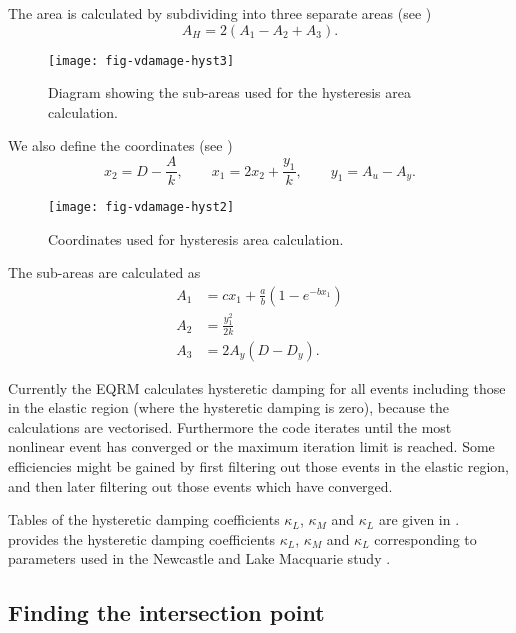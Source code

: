 The area is calculated by subdividing into three separate areas
(see )
$$
 A_H = 2(A_1-A_2+A_3).
$$

\begin{figure}[htp]
\centering
{}
\texttt{[image: fig-vdamage-hyst3]}
\caption{Diagram showing the sub-areas used for the hysteresis
area calculation.}
\label{fig:vdamage-hyst3}
\end{figure}


We also define the coordinates (see )
$$
x_2 = D-\frac{A}{k}, \qquad x_1 = 2x_2+\frac{y_1}{k}, \qquad y_1 =
A_u-A_y.
$$

\begin{figure}[htp]
\centering {}  
  
\texttt{[image: fig-vdamage-hyst2]}
\caption{Coordinates used for hysteresis area calculation.}
\label{fig:vdamage-hyst2}
\end{figure}

The sub-areas are calculated as
\begin{align*}
 A_1 &= cx_1+\frac{a}{b}(1-e^{-bx_1})\\
 A_2 &= \frac{y_1^2}{2k}\\
 A_3 &= 2A_y(D-D_y).
\end{align*}

Currently the EQRM calculates
hysteretic damping for all events including those in the elastic
region (where the hysteretic damping is zero), because the
calculations are vectorised. Furthermore the code iterates until
the most nonlinear event has converged or the maximum iteration
limit is reached. Some efficiencies might be gained by first
filtering out those events in the elastic region, and then later
filtering out those events which have converged.

Tables of the hysteretic damping coefficients $\kappa_L$,
$\kappa_M$ and $\kappa_L$ are given in .
 provides the hysteretic damping
coefficients $\kappa_L$, $\kappa_M$ and $\kappa_L$ corresponding
to parameters used in the Newcastle and Lake Macquarie study
\citep{dr_Fulford02a}.



\subsection{Finding the intersection point}

